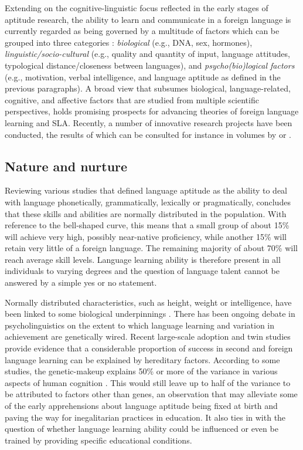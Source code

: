 \documentclass[output=paper]{langsci/langscibook}
\begin{document}
Extending on the cognitive-linguistic focus reflected in the early stages of aptitude research, the ability to learn and communicate in a foreign language is currently regarded as being governed by a multitude of factors which can be grouped into three categories \citep{Reiterer2009}: \textit{biological} (e.g., DNA, sex, hormones), \textit{linguistic\slash socio-cultural} (e.g., quality and quantity of input, language attitudes, typological distance/closeness between languages), and \textit{psycho(bio)logical factors} (e.g., motivation, verbal intelligence, and language aptitude as defined in the previous paragraphs). A broad view that subsumes biological, language-related, cognitive, and affective factors that are studied from multiple scientific perspectives, holds promising prospects for advancing theories of foreign language learning and SLA. Recently, a number of innovative research projects have been conducted, the results of which can be consulted for instance in volumes by \citet{Reiterer2019} or \citet{WenEtAl2019}. 

\subsection{Nature and nurture}

Reviewing various studies that defined language aptitude as the ability to deal with language phonetically, grammatically, lexically or pragmatically, \citet{Reiterer2019} concludes that these skills and abilities are normally distributed in the population. With reference to the bell-shaped curve, this means that a small group of about 15\% will achieve very high, possibly near-native proficiency, while another 15\% will retain very little of a foreign language. The remaining majority of about 70\% will reach average skill levels. Language learning ability is therefore present in all individuals to varying degrees and the question of language talent cannot be answered by a simple yes or no statement.

Normally distributed characteristics, such as height, weight or intelligence, have been linked to some biological underpinnings \citep{Reiterer2019}. There has been ongoing debate in psycholinguistics on the extent to which language learning and variation in achievement are genetically wired. Recent large-scale adoption and twin studies provide evidence that a considerable proportion of success in second and foreign language learning can be explained by hereditary factors. According to some studies, the genetic-makeup explains 50\% or more of the variance in various aspects of human cognition \citep{DaleEtAl2010, Stromswold2001, RimfeldEtAl2015}. This would still leave up to half of the variance to be attributed to factors other than genes, an observation that may alleviate some of the early apprehensions about language aptitude being fixed at birth and paving the way for inegalitarian practices in education. It also ties in with the question of whether language learning ability could be influenced or even be trained by providing specific educational conditions. 
\end{document}
